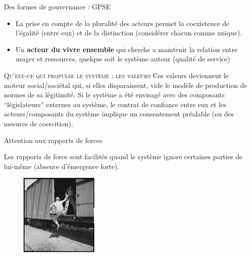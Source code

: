 \documentclass[newPxFont]{beamer}
\begin{document}
\begin{frame}[c]{Des formes de gouvernance : GPSE}
\vspace{-1cm}
\begin{itemize}
    \item La prise en compte de la pluralité des acteurs permet la coexistence de l’égalité (entre eux) et de la distinction (considérer chacun comme unique).
    \item Un \textbf{acteur du vivre ensemble} qui cherche a maintenir la relation entre usager et ressources, quelque soit le système autour (qualité de service)
\end{itemize}
 \small{
   \begin{alertblock}{\textsc{Qu'est-ce qui propulse le système : les valeurs }}
    Ces valeurs deviennent le moteur social/sociétal qui, si elles disparaissent, vide le modèle de production de normes de sa légitimité. Si le système a été envisagé avec des composants “législateurs” externes au système, le contrat de confiance entre eux et les acteurs/composants du système implique un consentement préalable (ou des mesures de coercition).
   \end{alertblock}
 }
\end{frame}

\begin{frame}[c]{Attention aux rapports de forces}
\vspace{-1cm}

Les rapports de force sont facilités quand le système ignore certaines parties de lui-même (absence d'émergence forte).

\begin{figure}
  \includegraphics[height=4cm]{img/valeurs.jpg}
\end{figure}


\end{frame}
\end{document}
